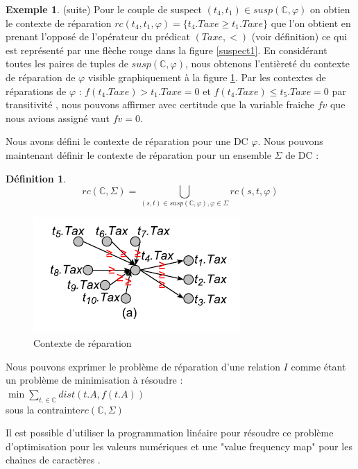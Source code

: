 \documentclass[letterpaper, 12pt]{report}
\theoremstyle{definition}
\newtheorem{mydef}{Définition}
\newtheorem{myexample}{Exemple}
\begin{document}
\begin{myexample} (suite)
Pour le couple de suspect $(t_4,t_1) \in susp(\mathbb{C},\varphi)$ on obtien le contexte de réparation $rc(t_4,t_1,\varphi) = \{ t_4.Taxe \geq t_1.Taxe \}$ que l'on obtient en prenant l'opposé de l'opérateur du prédicat $(Taxe, <)$ (voir définition) ce qui est représenté par une flèche rouge dans la figure \ref{suspect1}. En considérant toutes les paires de tuples de $susp(\mathbb{C},\varphi)$, nous obtenons l'entièreté du contexte de réparation de $\varphi$ visible graphiquement à la figure \ref{context}. Par les contextes de réparations de $\varphi$ : $f(t_4.Taxe) > t_1.Taxe = 0$ et $f(t_4.Taxe) \leq t_5.Taxe = 0$ par transitivité , nous pouvons affirmer avec certitude que la variable fraiche $fv$ que nous avions assigné vaut $fv = 0$.
\end{myexample}

Nous avons défini le contexte de réparation pour une DC $\varphi$. Nous pouvons maintenant définir le contexte de réparation pour un ensemble $\Sigma$ de DC : 
\begin{mydef}
	$$rc(\mathbb{C},\Sigma) = \bigcup_{(s,t) \in susp(\mathbb{C},\varphi), \varphi \in  \Sigma} rc(s,t,\varphi)$$
\end{mydef}

\begin{figure}
\centering
\includegraphics[scale=1]{img/context.png}
\caption{\label{context} Contexte de réparation}
\end{figure}

Nous pouvons exprimer le problème de réparation d'une relation $I$ comme étant un problème de minimisation à résoudre : \\

$\min \sum_{t. \in \mathbb{C}} dist(t.A,f(t.A))$ \\
sous la contrainte$ rc(\mathbb{C} , \Sigma)$

Il est possible d'utiliser la programmation linéaire pour résoudre ce problème d'optimisation pour les valeurs numériques et une "value frequency map" pour les chaines de caractères \cite{main}.\\
\end{document}
